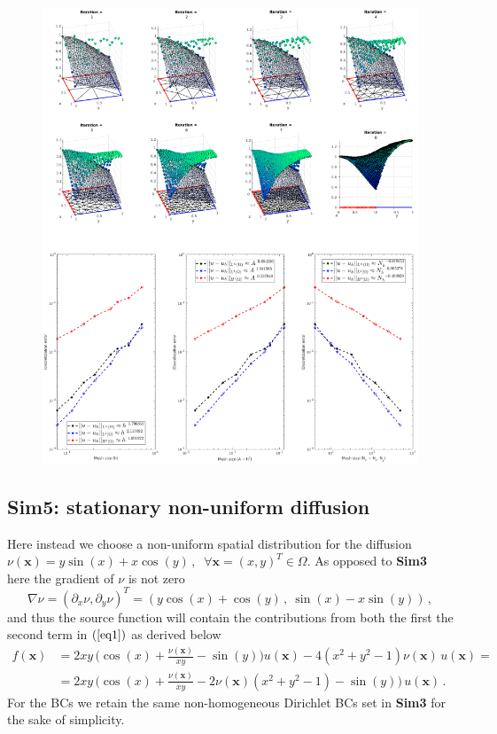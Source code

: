 \documentclass[12pt,openany,twoside,a4paper]{article}
\begin{document}
\begin{figure}[H]
    \centering
    \includegraphics[keepaspectratio,height=0.675\textheight]{sim4.2.png}
    \label{sim4.2}
\end{figure}

\subsection{Sim5: stationary non-uniform diffusion}
Here instead we choose a non-uniform spatial distribution for the diffusion $\nu(\mathbf{x}) = y\sin(x) + x\cos(y) \,,\;\;\forall\mathbf{x}=(x,y)^T\in\Omega$.
As opposed to \textbf{Sim3} here the gradient of $\nu$ is not zero
\begin{equation*}
    \nabla\nu = (\partial_x\nu,\partial_y\nu)^T=(y\cos(x)+\cos(y)\,,\:\sin(x)-x\sin(y))\,,
\end{equation*}
and thus the source function will contain the contributions from both the first the second term in $(\ref{eq1})$ as derived below
\newpage
\begin{align*}
    f(\mathbf{x}) &= 2xy\,\bigg(\cos(x) + \frac{\nu(\mathbf{x})}{xy} - \sin(y)\bigg)u(\mathbf{x}) - 4(x^2 + y^2 -1)\nu(\mathbf{x})\,u(\mathbf{x}) = \\
    &= 2xy\,\bigg(\cos(x) + \frac{\nu(\mathbf{x})}{xy}-2\nu(\mathbf{x})(x^2 + y^2 -1)-\sin(y)\bigg)\,u(\mathbf{x})\,.
\end{align*}
For the BCs we retain the same non-homogeneous Dirichlet BCs set in \textbf{Sim3} for the sake of simplicity.
\end{document}
